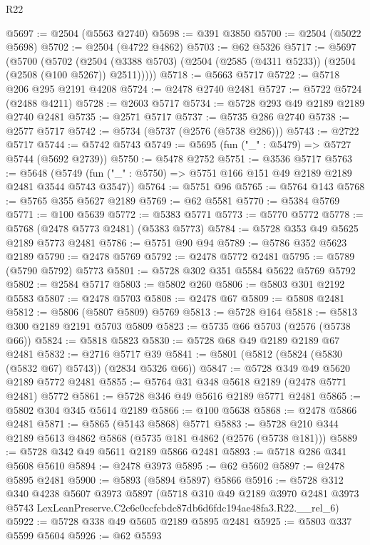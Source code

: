 \begin{lexlean}{R22}
\begin{coremodule}
@5697 := @2504 (@5563 @2740)
@5698 := @391 @3850
@5700 := @2504 (@5022 @5698)
@5702 := @2504 (@4722 @4862)
@5703 := @62 @5326
@5717 := @5697
    (@5700
      (@5702
        (@2504 (@3388 @5703) (@2504 (@2585 (@4311 @5233)) (@2504 (@2508 (@100 @5267)) @2511)))))
@5718 := @5663 @5717
@5722 := @5718 @206 @295 @2191 @4208
@5724 := @2478 @2740 @2481
@5727 := @5722 @5724 (@2488 @4211)
@5728 := @2603 @5717
@5734 := @5728 @293 @49 @2189 @2189 @2740 @2481
@5735 := @2571 @5717
@5737 := @5735 @286 @2740
@5738 := @2577 @5717
@5742 := @5734 (@5737 (@2576 (@5738 @286)))
@5743 := @2722 @5717
@5744 := @5742 @5743
@5749 := @5695 (fun ("_" : @5479) => @5727 @5744 (@5692 @2739))
@5750 := @5478 @2752
@5751 := @3536 @5717
@5763 := @5648
    (@5749 (fun ("_" : @5750) => @5751 @166 @151 @49 @2189 @2189 @2481 @3544 @5743 @3547))
@5764 := @5751 @96
@5765 := @5764 @143
@5768 := @5765 @355 @5627 @2189
@5769 := @62 @5581
@5770 := @5384 @5769
@5771 := @100 @5639
@5772 := @5383 @5771
@5773 := @5770 @5772
@5778 := @5768 (@2478 @5773 @2481) (@5383 @5773)
@5784 := @5728 @353 @49 @5625 @2189 @5773 @2481
@5786 := @5751 @90 @94
@5789 := @5786 @352 @5623 @2189
@5790 := @2478 @5769
@5792 := @2478 @5772 @2481
@5795 := @5789 (@5790 @5792) @5773
@5801 := @5728 @302 @351 @5584 @5622 @5769 @5792
@5802 := @2584 @5717
@5803 := @5802 @260
@5806 := @5803 @301 @2192 @5583
@5807 := @2478 @5703
@5808 := @2478 @67
@5809 := @5808 @2481
@5812 := @5806 (@5807 @5809) @5769
@5813 := @5728 @164
@5818 := @5813 @300 @2189 @2191 @5703 @5809
@5823 := @5735 @66 @5703 (@2576 (@5738 @66))
@5824 := @5818 @5823
@5830 := @5728 @68 @49 @2189 @2189 @67 @2481
@5832 := @2716 @5717 @39
@5841 := @5801 (@5812 (@5824 (@5830 (@5832 @67) @5743)) (@2834 @5326 @66))
@5847 := @5728 @349 @49 @5620 @2189 @5772 @2481
@5855 := @5764 @31 @348 @5618 @2189 (@2478 @5771 @2481) @5772
@5861 := @5728 @346 @49 @5616 @2189 @5771 @2481
@5865 := @5802 @304 @345 @5614 @2189
@5866 := @100 @5638
@5868 := @2478 @5866 @2481
@5871 := @5865 (@5143 @5868) @5771
@5883 := @5728 @210 @344 @2189 @5613 @4862 @5868 (@5735 @181 @4862 (@2576 (@5738 @181)))
@5889 := @5728 @342 @49 @5611 @2189 @5866 @2481
@5893 := @5718 @286 @341 @5608 @5610
@5894 := @2478 @3973
@5895 := @62 @5602
@5897 := @2478 @5895 @2481
@5900 := @5893 (@5894 @5897) @5866
@5916 := @5728
    @312
    @340
    @4238
    @5607
    @3973
    @5897
    (@5718
      @310
      @49
      @2189
      @3970
      @2481
      @3973
      @5743
      LexLeanPreserve.C2c6c0ccfcbdc87db6d6fdc194ae48fa3.R22.__rel_6)
@5922 := @5728 @338 @49 @5605 @2189 @5895 @2481
@5925 := @5803 @337 @5599 @5604
@5926 := @62 @5593

\end{coremodule}
\end{lexlean}
